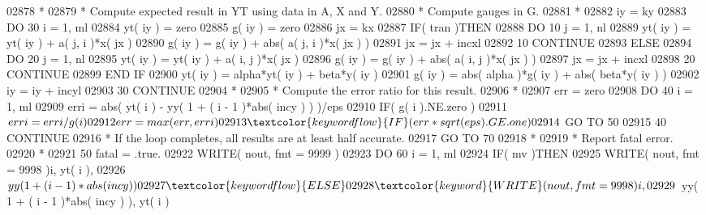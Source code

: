 \begin{DoxyCode}
02878 \textcolor{comment}{*}
02879 \textcolor{comment}{*     Compute expected result in YT using data in A, X and Y.}
02880 \textcolor{comment}{*     Compute gauges in G.}
02881 \textcolor{comment}{*}
02882       iy = ky
02883       \textcolor{keywordflow}{DO} 30 i = 1, ml
02884          yt( iy ) = zero
02885          g( iy ) = zero
02886          jx = kx
02887          \textcolor{keywordflow}{IF}( tran )\textcolor{keywordflow}{THEN}
02888             \textcolor{keywordflow}{DO} 10 j = 1, nl
02889                yt( iy ) = yt( iy ) + a( j, i )*x( jx )
02890                g( iy ) = g( iy ) + abs( a( j, i )*x( jx ) )
02891                jx = jx + incxl
02892    10       \textcolor{keywordflow}{CONTINUE}
02893          \textcolor{keywordflow}{ELSE}
02894             \textcolor{keywordflow}{DO} 20 j = 1, nl
02895                yt( iy ) = yt( iy ) + a( i, j )*x( jx )
02896                g( iy ) = g( iy ) + abs( a( i, j )*x( jx ) )
02897                jx = jx + incxl
02898    20       \textcolor{keywordflow}{CONTINUE}
02899 \textcolor{keywordflow}{         END IF}
02900          yt( iy ) = alpha*yt( iy ) + beta*y( iy )
02901          g( iy ) = abs( alpha )*g( iy ) + abs( beta*y( iy ) )
02902          iy = iy + incyl
02903    30 \textcolor{keywordflow}{CONTINUE}
02904 \textcolor{comment}{*}
02905 \textcolor{comment}{*     Compute the error ratio for this result.}
02906 \textcolor{comment}{*}
02907       err = zero
02908       \textcolor{keywordflow}{DO} 40 i = 1, ml
02909          erri = abs( yt( i ) - yy( 1 + ( i - 1 )*abs( incy ) ) )/eps
02910          \textcolor{keywordflow}{IF}( g( i ).NE.zero )
02911      $      erri = erri/g( i )
02912          err = max( err, erri )
02913          \textcolor{keywordflow}{IF}( err*sqrt( eps ).GE.one )
02914      $      \textcolor{keywordflow}{GO TO} 50
02915    40 \textcolor{keywordflow}{CONTINUE}
02916 \textcolor{comment}{*     If the loop completes, all results are at least half accurate.}
02917       \textcolor{keywordflow}{GO TO} 70
02918 \textcolor{comment}{*}
02919 \textcolor{comment}{*     Report fatal error.}
02920 \textcolor{comment}{*}
02921    50 fatal = .true.
02922       \textcolor{keyword}{WRITE}( nout, fmt = 9999 )
02923       \textcolor{keywordflow}{DO} 60 i = 1, ml
02924          \textcolor{keywordflow}{IF}( mv )\textcolor{keywordflow}{THEN}
02925             \textcolor{keyword}{WRITE}( nout, fmt = 9998 )i, yt( i ),
02926      $         yy( 1 + ( i - 1 )*abs( incy ) )
02927          \textcolor{keywordflow}{ELSE}
02928             \textcolor{keyword}{WRITE}( nout, fmt = 9998 )i,
02929      $         yy( 1 + ( i - 1 )*abs( incy ) ), yt( i )

\end{DoxyCode}
